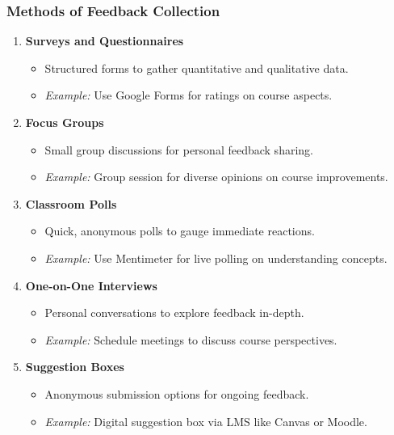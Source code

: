 \documentclass{beamer}
\begin{document}
\begin{frame}[fragile]
    \frametitle{Methods of Feedback Collection}
    \begin{enumerate}
        \item \textbf{Surveys and Questionnaires}
        \begin{itemize}
            \item Structured forms to gather quantitative and qualitative data.
            \item \textit{Example:} Use Google Forms for ratings on course aspects.
        \end{itemize}
        
        \item \textbf{Focus Groups}
        \begin{itemize}
            \item Small group discussions for personal feedback sharing.
            \item \textit{Example:} Group session for diverse opinions on course improvements.
        \end{itemize}
        
        \item \textbf{Classroom Polls}
        \begin{itemize}
            \item Quick, anonymous polls to gauge immediate reactions.
            \item \textit{Example:} Use Mentimeter for live polling on understanding concepts.
        \end{itemize}
        
        \item \textbf{One-on-One Interviews}
        \begin{itemize}
            \item Personal conversations to explore feedback in-depth.
            \item \textit{Example:} Schedule meetings to discuss course perspectives.
        \end{itemize}
        
        \item \textbf{Suggestion Boxes}
        \begin{itemize}
            \item Anonymous submission options for ongoing feedback.
            \item \textit{Example:} Digital suggestion box via LMS like Canvas or Moodle.
        \end{itemize}
    \end{enumerate}
\end{frame}
\end{document}
